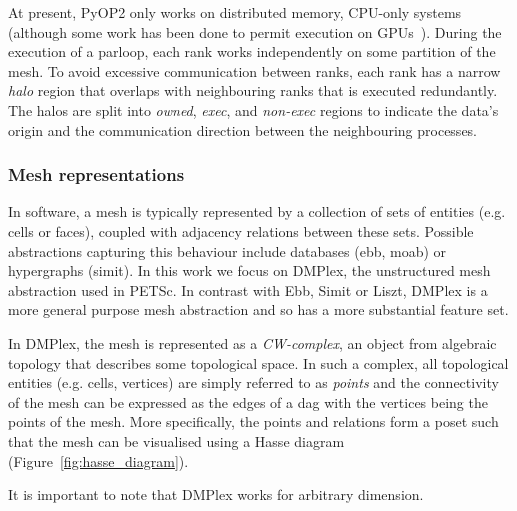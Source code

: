   At present, PyOP2 only works on distributed memory, CPU-only systems (although some work has been done to permit execution on GPUs~\cite{fenics2021-kulkarni}).
  During the execution of a parloop, each rank works independently on some partition of the mesh.
  To avoid excessive communication between ranks, each rank has a narrow \textit{halo} region that overlaps with neighbouring ranks that is executed redundantly.
  The halos are split into \textit{owned}, \textit{exec}, and \textit{non-exec} regions to indicate the data's origin and the communication direction between the neighbouring processes.



\subsubsection{Mesh representations}


In software, a mesh is typically represented by a collection of sets of entities (e.g. cells or faces), coupled with adjacency relations between these sets.
Possible abstractions capturing this behaviour include databases (ebb, moab) or hypergraphs (simit).
In this work we focus on DMPlex, the unstructured mesh abstraction used in PETSc.
In contrast with Ebb, Simit or Liszt, DMPlex is a more general purpose mesh abstraction and so has a more substantial feature set.


In DMPlex, the mesh is represented as a \textit{CW-complex}, an object from algebraic topology that describes some topological space.
In such a complex, all topological entities (e.g. cells, vertices) are simply referred to as \textit{points} and the connectivity of the mesh can be expressed as the edges of a \gls{dag} with the vertices being the points of the mesh.
More specifically, the points and relations form a \gls{poset} such that the mesh can be visualised using a Hasse diagram (Figure~\ref{fig:hasse_diagram}).

It is important to note that DMPlex works for arbitrary dimension.

